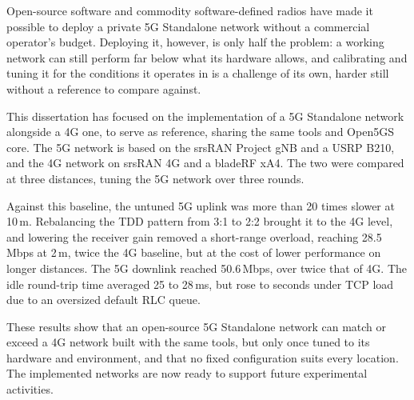 
%

Open-source software and commodity software-defined radios have made it possible to deploy a private 5G Standalone network without a commercial operator's budget. Deploying it, however, is only half the problem: a working network can still perform far below what its hardware allows, and calibrating and tuning it for the conditions it operates in is a challenge of its own, harder still without a reference to compare against.

This dissertation has focused on the implementation of a 5G Standalone network alongside a 4G one, to serve as reference, sharing the same tools and Open5GS core. The 5G network is based on the srsRAN Project gNB and a USRP B210, and the 4G network on srsRAN 4G and a bladeRF xA4. The two were compared at three distances, tuning the 5G network over three rounds.

Against this baseline, the untuned 5G uplink was more than 20 times slower at 10\,m. Rebalancing the TDD pattern from 3:1 to 2:2 brought it to the 4G level, and lowering the receiver gain removed a short-range overload, reaching 28.5\,Mbps at 2\,m, twice the 4G baseline, but at the cost of lower performance on longer distances. The 5G downlink reached 50.6\,Mbps, over twice that of 4G. The idle round-trip time averaged 25 to 28\,ms, but rose to seconds under TCP load due to an oversized default RLC queue.

These results show that an open-source 5G Standalone network can match or exceed a 4G network built with the same tools, but only once tuned to its hardware and environment, and that no fixed configuration suits every location. The implemented networks are now ready to support future experimental activities.

